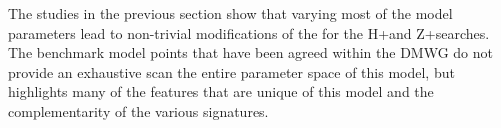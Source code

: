 
%
%
%
%
%
%
%
%
%
%
%


The studies in the previous section show that varying most of the model parameters lead to non-trivial modifications of the for the H+\MET and Z+\MET searches. 
The benchmark model points that have been agreed within the DMWG do not provide an exhaustive scan the entire parameter space of this model, but highlights many of the features that are unique of this model and the complementarity of the various signatures. 

